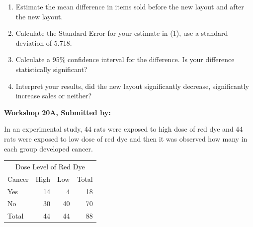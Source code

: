 \documentclass[11pt, chapterprefix=true]{scrbook}\usepackage[]{graphicx}\usepackage[]{color}
\begin{document}
\begin{exercises}
\begin{exercise}
\begin{enumerate}
  \item Estimate the mean difference in items sold before the new layout and after the new layout.
  \item	Calculate the Standard Error for your estimate in (1), use a standard deviation of 5.718.
  \item	Calculate a 95\% confidence interval for the difference. Is your difference statistically significant?
  \item	Interpret your results, did the new layout significantly decrease, significantly increase sales or neither?
\end{enumerate}

\end{exercise}
\begin{solution}  %

\end{solution}


\clearpage

    \begin{exercise}  %

    \begin{center}
\begin{flushleft}\textbf{\large \hfill Workshop 20A, Submitted by: }\end{flushleft}

\end{center}

In an experimental study, 44 rats were exposed to high dose of red dye and 44 rats were exposed to low dose of red dye and then it was observed how many in each group developed cancer. 
			
\begin{table}[ht]
\centering				
\begin{tabular}{@{} l rrr @{}} \hline				
  \multicolumn{4}{c}{Dose Level of Red Dye} \\	
Cancer&	High&	Low&	Total \\ \hline
Yes &	14 &	4 &	18 \\
No &	30 &	40 &	70 \\ \hline
Total &	44 &	44 &	88 \\ \hline
\end{tabular}
\end{table}


\end{exercise}
\end{exercises}
\end{document}
